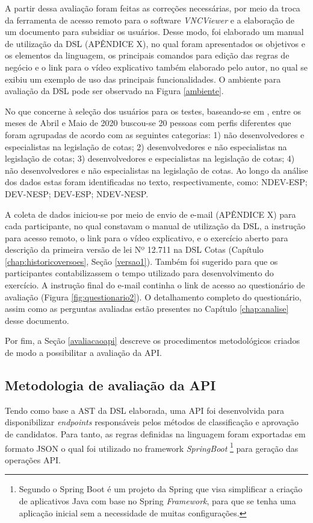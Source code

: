  A partir dessa avaliação foram feitas as correções necessárias, por meio da troca da ferramenta de acesso remoto para o software \textit{VNCViewer} e a elaboração de um documento para subsidiar os usuários. Desse modo, foi elaborado um manual de utilização da DSL (APÊNDICE X), no qual foram apresentados os objetivos e os elementos da linguagem, os principais comandos para edição das regras de negócio e o link para o vídeo explicativo também elaborado pelo autor, no qual se exibiu um exemplo de uso das principais funcionalidades. O ambiente para avaliação da DSL pode ser observado na Figura \ref{ambiente}.
 
 
  
 
 No que concerne à seleção dos usuários para os testes, baseando-se em , entre os meses de Abril e Maio de 2020 buscou-se 20 pessoas com perfis diferentes que foram agrupadas de acordo com as seguintes categorias: 1) não desenvolvedores e especialistas na legislação de cotas; 2) desenvolvedores e não especialistas na legislação de cotas; 3) desenvolvedores e especialistas na legislação de cotas; 4) não desenvolvedores e não especialistas na legislação de cotas. Ao longo da análise dos dados estas foram identificadas no texto, respectivamente, como: NDEV-ESP; DEV-NESP; DEV-ESP; NDEV-NESP. 

 A coleta de dados iniciou-se por meio de envio de e-mail (APÊNDICE X) para cada participante, no qual constavam o manual de utilização da DSL, a instrução para acesso remoto, o link para o vídeo explicativo, e o exercício aberto para descrição da primeira versão de lei Nº 12.711 na DSL Cotas (Capítulo \ref{chap:historicoversoes}, Seção \ref{versao1}). Também foi sugerido para que os participantes contabilizassem o tempo utilizado para desenvolvimento do exercício. A instrução final do e-mail continha o link de acesso ao questionário de avaliação (Figura \ref{fig:questionario2}). O detalhamento completo do questionário, assim como as perguntas avaliadas estão presentes no Capítulo \ref{chap:analise} desse documento.

 
 
 \newpage
 Por fim, a Seção \ref{avaliacaoapi} descreve os procedimentos metodológicos criados de modo a possibilitar a avaliação da \gls{API}.
 

\subsection{Metodologia de avaliação da API}
\label{metodoapi}
Tendo como base a \gls{AST} da DSL elaborada, uma \gls{API} foi desenvolvida para disponibilizar \textit{endpoints} responsáveis pelos métodos de classificação e aprovação de candidatos. Para tanto, as regras definidas na linguagem foram exportadas em formato JSON o qual foi utilizado no framework \textit{SpringBoot} \footnote{Segundo  o Spring Boot é um projeto da Spring que visa simplificar a criação de aplicativos Java com base no Spring \textit{Framework}, para que se tenha uma aplicação inicial sem a necessidade de muitas configurações.} para geração das operações \gls{API}. 

